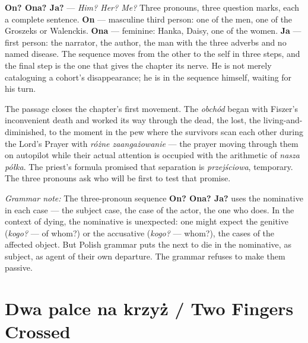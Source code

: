 \textbf{On? Ona? Ja?} --- \textit{Him? Her? Me?} Three
pronouns, three question marks, each a complete sentence.
\textbf{On} --- masculine third person: one of the men,
one of the Groszeks or Walenckis. \textbf{Ona} ---
feminine: Hanka, Daisy, one of the women. \textbf{Ja}
--- first person: the narrator, the author, the man with
the three adverbs and no named disease. The sequence
moves from the other to the self in three steps, and
the final step is the one that gives the chapter its
nerve. He is not merely cataloguing a cohort's
disappearance; he is in the sequence himself, waiting
for his turn.

\medskip
The passage closes the chapter's first movement. The
\textit{obchód} began with Fiszer's inconvenient death
and worked its way through the dead, the lost, the
living-and-diminished, to the moment in the pew where
the survivors scan each other during the Lord's Prayer
with \textit{różne zaangażowanie} --- the prayer moving
through them on autopilot while their actual attention
is occupied with the arithmetic of \textit{nasza półka}.
The priest's formula promised that separation is
\textit{przejściowa}, temporary. The three pronouns
ask who will be first to test that promise.

\medskip
\noindent\textit{Grammar note:} The three-pronoun
sequence \textbf{On? Ona? Ja?} uses the nominative in
each case --- the subject case, the case of the actor,
the one who does. In the context of dying, the nominative
is unexpected: one might expect the genitive
(\textit{kogo?} --- of whom?) or the accusative
(\textit{kogo?} --- whom?), the cases of the affected
object. But Polish grammar puts the next to die in the
nominative, as subject, as agent of their own departure.
The grammar refuses to make them passive.

\section{Dwa palce na krzyż / Two Fingers Crossed}




